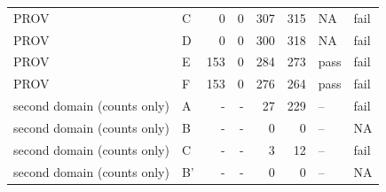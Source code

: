 \begin{tabular}{llrrrrll}
PROV & C & 0 & 0 & 307 & 315 & NA & fail \\
PROV & D & 0 & 0 & 300 & 318 & NA & fail \\
PROV & E & 153 & 0 & 284 & 273 & pass & fail \\
PROV & F & 153 & 0 & 276 & 264 & pass & fail \\
second domain (counts only) & A & - & - & 27 & 229 & -- & fail \\
second domain (counts only) & B & - & - & 0 & 0 & -- & NA \\
second domain (counts only) & C & - & - & 3 & 12 & -- & fail \\
second domain (counts only) & B' & - & - & 0 & 0 & -- & NA \\
\hline
\end{tabular}
